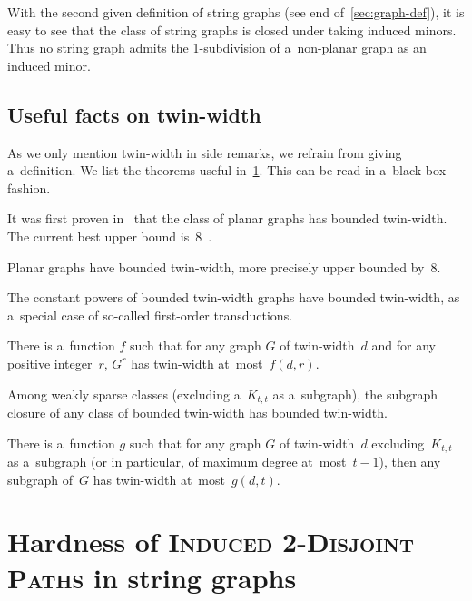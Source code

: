 \documentclass[a4paper,UKenglish,cleveref,autoref]{lipics-v2021}
\begin{document}
With the second given definition of string graphs (see end of~\cref{sec:graph-def}), it is easy to see that the class of string graphs is closed under taking induced minors.
Thus no string graph admits the 1-subdivision of a~non-planar graph as an induced minor. 

\subsection{Useful facts on twin-width}

As we only mention twin-width in side remarks, we refrain from giving a~definition.
We list the theorems useful in~\cref{sec:i2dp}.
This can be read in a~black-box fashion.

It was first proven in~\cite{twin-width1} that the class of planar graphs has bounded twin-width.
The current best upper bound is~8~\cite{HlinenyJ23}.

\begin{theorem}\label{thm:planar-tww}
  Planar graphs have bounded twin-width, more precisely upper bounded by~8.
\end{theorem}

The constant powers of bounded twin-width graphs have bounded twin-width, as a~special case of so-called first-order transductions.

\begin{theorem}\label{thm:power-tww}
  There is a~function $f$ such that for any graph $G$ of twin-width~$d$ and for any positive integer~$r$, $G^r$ has twin-width at~most~$f(d,r)$.
\end{theorem}

Among weakly sparse classes (excluding a~$K_{t,t}$ as a~subgraph), the subgraph closure of any class of bounded twin-width has bounded twin-width.  

\begin{theorem}\label{thm:ws-subgraph-closure}
  There is a~function $g$ such that for any graph $G$ of twin-width~$d$ excluding~$K_{t,t}$ as a~subgraph (or in particular, of maximum degree at~most~$t-1$), then any subgraph of~$G$ has twin-width at~most~$g(d,t)$. 
\end{theorem}

\section{Hardness of \textsc{Induced 2-Disjoint Paths} in string graphs}\label{sec:i2dp}
\end{document}
